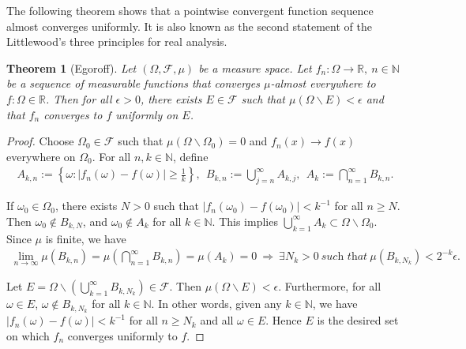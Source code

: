\documentclass{article}
\numberwithin{equation}{section}
\theoremstyle{plain}
\newtheorem{theorem}{Theorem}[section]
\theoremstyle{definition}
\begin{document}
The following theorem shows that a pointwise convergent function sequence almost converges uniformly. It is also known as the second statement of the Littlewood's three principles for real analysis.

\begin{theorem}[Egoroff]\label{thm:1.37} Let $(\Omega,\mathscr{F},\mu)$ be a  measure space. Let $f_n:\Omega\to\mathbb{R},\ n\in\mathbb{N}$ be a sequence of measurable functions that converges $\mu$-almost everywhere to $f:\Omega\in\mathbb{R}$. Then for all $\epsilon>0$, there exists $E\in\mathscr{F}$ such that $\mu(\Omega\backslash E)<\epsilon$ and that $f_n$ converges to $f$ uniformly on $E$.
\end{theorem}
\begin{proof}
Choose $\Omega_0\in\mathscr{F}$ such that $\mu(\Omega\backslash\Omega_0)=0$ and $f_n(x)\to f(x)$ everywhere on $\Omega_0$. For all $n,k\in\mathbb{N}$, define
\begin{align*}
	A_{k,n}:=\left\{\omega:\vert f_n(\omega)-f(\omega)\vert\geq\frac{1}{k}\right\},\ \ B_{k,n}:=\bigcup_{j=n}^\infty A_{k,j},\ \ A_k:=\bigcap_{n=1}^\infty B_{k,n}.
\end{align*}

If $\omega_0\in\Omega_0$, there exists $N>0$ such that $\vert f_n(\omega_0)-f(\omega_0)\vert < k^{-1}$ for all $n\geq N$. Then $\omega_0\notin B_{k,N}$, and $\omega_0\notin A_k$ for all $k\in\mathbb{N}$. This implies $\bigcup_{k=1}^\infty A_k\subset \Omega\backslash\Omega_0$. Since $\mu$ is finite, we have
\begin{align*}
	\lim_{n\to\infty} \mu(B_{k,n}) = \mu\left(\bigcap_{n=1}^\infty B_{k,n}\right) = \mu(A_k) = 0\ \Rightarrow\ \exists N_k>0\ \textit{such that}\ \mu\left(B_{k,N_k}\right)< 2^{-k}\epsilon.
\end{align*}

Let $E=\Omega\backslash\left(\bigcup_{k=1}^\infty B_{k,N_k}\right)\in\mathscr{F}$. Then $\mu(\Omega\backslash E)<\epsilon$. Furthermore, for all $\omega\in E$, $\omega\notin B_{k,N_k}$ for all $k\in\mathbb{N}$. In other words, given any $k\in\mathbb{N}$, we have $\vert f_n(\omega)-f(\omega)\vert < k^{-1}$ for all $n\geq N_k$ and all $\omega\in E$. Hence $E$ is the desired set on which $f_n$ converges uniformly to $f$.
\end{proof}

\newpage
\end{document}
